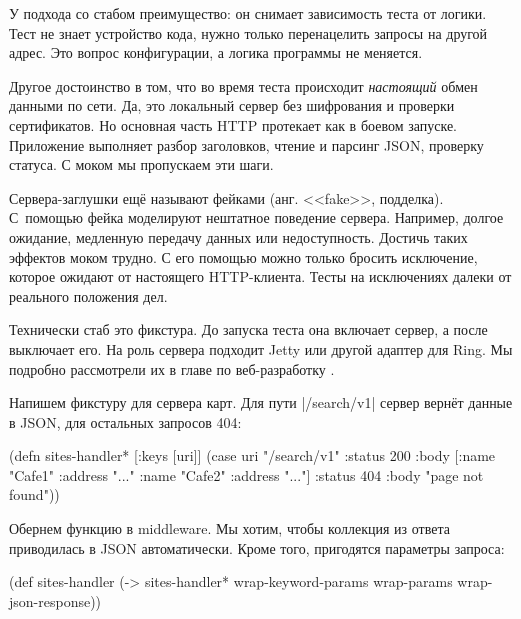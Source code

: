 У подхода со стабом преимущество: он снимает зависимость теста от логики. Тест
не знает устройство кода, нужно только перенацелить запросы на другой адрес. Это
вопрос конфигурации, а логика программы не меняется.

Другое достоинство в том, что во время теста происходит \emph{настоящий} обмен
данными по сети. Да, это локальный сервер без шифрования и проверки
сертификатов. Но основная часть HTTP протекает как в боевом запуске. Приложение
выполняет разбор заголовков, чтение и парсинг JSON, проверку статуса. С моком мы
пропускаем эти шаги.


Сервера-заглушки ещ\"{е} называют фейками (анг. <<fake>>, подделка). С~помощью фейка
моделируют нештатное поведение сервера. Например, долгое ожидание, медленную
передачу данных или недоступность. Достичь таких эффектов моком трудно. С его
помощью можно только бросить исключение, которое ожидают от настоящего
HTTP-клиента. Тесты на исключениях далеки от реального положения дел.

Технически стаб это фикстура. До запуска теста она включает сервер, а после
выключает его. На роль сервера подходит Jetty или другой адаптер для Ring. Мы
подробно рассмотрели их в главе по веб-разработку .

Напишем фикстуру для сервера карт. Для пути \spverb|/search/v1| сервер верн\"{е}т
данные в JSON, для остальных запросов 404:

\label{sites-handler}

\begin{english}
  \begin{clojure}
(defn sites-handler* [{:keys [uri]}]
  (case uri
    "/search/v1"
    {:status 200
     :body [{:name "Cafe1" :address "..."}
            {:name "Cafe2" :address "..."}]}
    {:status 404
     :body "page not found"}))
  \end{clojure}
\end{english}


Обернем функцию в middleware. Мы хотим, чтобы коллекция из ответа приводилась в
JSON автоматически. Кроме того, пригодятся параметры запроса:

\begin{english}
  \begin{clojure}
(def sites-handler
  (-> sites-handler*
      wrap-keyword-params
      wrap-params
      wrap-json-response))
  \end{clojure}
\end{english}

